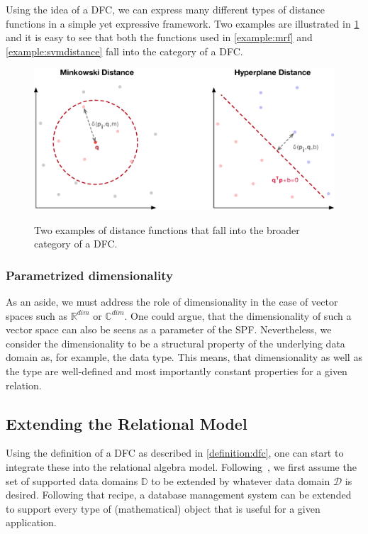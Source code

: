 Using the idea of a DFC, we can express many different types of distance functions in a simple yet expressive framework. Two examples are illustrated in \cref{figure:distance_computations} and it is easy to see that both the functions used in \cref{example:mrf} and \cref{example:svmdistance} fall into the category of a DFC.

\begin{figure}[bt]
    \centering
    \centering
    \includegraphics[width=\textwidth]{figures/distance_computations.eps}
    \label{figure:distance_computations}
    \caption{Two examples of distance functions that fall into the broader category of a DFC.}
\end{figure}

\subsubsection{Parametrized dimensionality}
As an aside, we must address the role of dimensionality in the case of vector spaces such as $\mathbb{R}^{dim}$ or $\mathbb{C}^{dim}$. One could argue, that the dimensionality of such a vector space can also be seens as a parameter of the SPF. Nevertheless, we consider the dimensionality to be a structural property of the underlying data domain as, for example, the data type. This means, that dimensionality as well as the type are well-defined and most importantly constant properties for a given relation.

\subsection{Extending the Relational Model}

Using the definition of a DFC as described in \cref{definition:dfc}, one can start to integrate these into the relational algebra model. Following~\cite{Giangreco:2018thesis}, we first assume the set of supported data domains $\mathbb{D}$ to be extended by whatever data domain $\mathcal{D}$ is desired. Following that recipe, a database management system can be extended to support every type of (mathematical) object that is useful for a given application.

